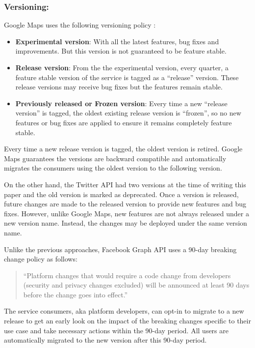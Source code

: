 \documentclass[runningheads,a4paper]{llncs}
\begin{document}
\subsubsection{Versioning:} %
\label{sub:versioning}
Google Maps uses the following versioning policy \cite{google_maps_versioning}:

\begin{itemize}
  \item \textbf{Experimental version}: With all the latest features, bug fixes and improvements. But this version is not guaranteed to be feature stable.
  \item \textbf{Release version}: From the the experimental version, every quarter, a feature stable version of the service is tagged as a ``release'' version. These release versions may receive bug fixes but the features remain stable.
  \item \textbf{Previously released or Frozen version}: Every time a new ``release version'' is tagged, the oldest existing release version is ``frozen'', so no new features or bug fixes are applied to ensure it remains completely feature stable.
\end{itemize}
Every time a new release version is tagged, the oldest version is retired. Google Maps guarantees the versions are backward compatible and automatically migrates the consumers using the oldest version to the following version.

On the other hand, the Twitter API had two versions at the time of writing this paper \cite{twitter_api} and the old version is marked as deprecated. Once a version is released, future changes are made to the released version to provide new features and bug fixes. However, unlike Google Maps, new features are not always released under a new version name. Instead, the changes may be deployed under the same version name.

Unlike the previous approaches, Facebook Graph API uses a 90-day breaking change policy as follows: \cite{facebook_api}

\begin{quote}
``Platform changes that would require a code change from developers (security and privacy changes excluded) will be announced at least 90 days before the change goes into effect.''
\end{quote}

The service consumers, aka platform developers, can opt-in to migrate to a new release to get an early look on the impact of the breaking changes specific to their use case and take necessary actions within the 90-day period. All users are automatically migrated to the new version after this 90-day period.
\end{document}

